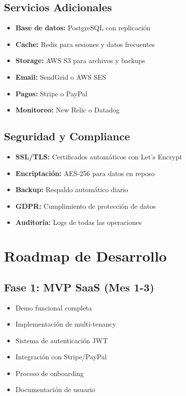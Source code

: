 \documentclass[12pt,a4paper]{article}
\begin{document}
\subsection{Servicios Adicionales}
\begin{itemize}
    \item \textbf{Base de datos:} PostgreSQL con replicación
    \item \textbf{Cache:} Redis para sesiones y datos frecuentes
    \item \textbf{Storage:} AWS S3 para archivos y backups
    \item \textbf{Email:} SendGrid o AWS SES
    \item \textbf{Pagos:} Stripe o PayPal
    \item \textbf{Monitoreo:} New Relic o Datadog
\end{itemize}

\subsection{Seguridad y Compliance}
\begin{itemize}
    \item \textbf{SSL/TLS:} Certificados automáticos con Let's Encrypt
    \item \textbf{Encriptación:} AES-256 para datos en reposo
    \item \textbf{Backup:} Respaldo automático diario
    \item \textbf{GDPR:} Cumplimiento de protección de datos
    \item \textbf{Auditoría:} Logs de todas las operaciones
\end{itemize}

\section{Roadmap de Desarrollo}

\subsection{Fase 1: MVP SaaS (Mes 1-3)}
\begin{itemize}
    \item [\checkmark] Demo funcional completa
    \item [ ] Implementación de multi-tenancy
    \item [ ] Sistema de autenticación JWT
    \item [ ] Integración con Stripe/PayPal
    \item [ ] Proceso de onboarding
    \item [ ] Documentación de usuario
\end{itemize}
\end{document}
